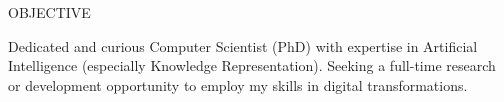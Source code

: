 %

\begin{rSection}{OBJECTIVE}

Dedicated and curious Computer Scientist (PhD) with expertise in Artificial Intelligence (especially Knowledge Representation). 
Seeking a full-time research or development opportunity to employ my skills in digital transformations.

\end{rSection}
